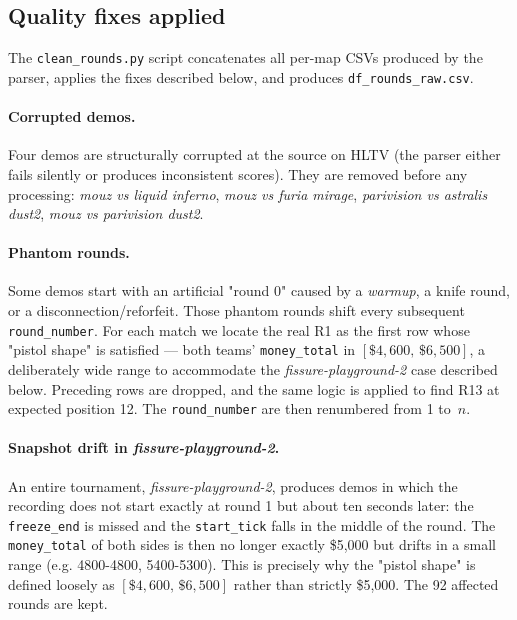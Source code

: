 \subsection{Quality fixes applied}
\label{annex:parsing_corrections}

The \texttt{clean\_rounds.py} script concatenates all per-map CSVs
produced by the parser, applies the fixes described below, and
produces \texttt{df\_rounds\_raw.csv}.

\paragraph{Corrupted demos.} Four demos are structurally corrupted at
the source on HLTV (the parser either fails silently or produces
inconsistent scores). They are removed before any processing:
\emph{mouz vs liquid inferno}, \emph{mouz vs furia mirage},
\emph{parivision vs astralis dust2}, \emph{mouz vs parivision dust2}.

\paragraph{Phantom rounds.} Some demos start with an artificial
"round 0" caused by a \emph{warmup}, a knife round, or a
disconnection/reforfeit. Those phantom rounds shift every subsequent
\texttt{round\_number}. For each match we locate the real R1 as the
first row whose "pistol shape" is satisfied --- both teams'
\texttt{money\_total} in $[\$4{,}600,\, \$6{,}500]$, a deliberately
wide range to accommodate the \textit{fissure-playground-2} case
described below. Preceding rows are dropped, and the same logic is
applied to find R13 at expected position 12. The
\texttt{round\_number} are then renumbered from 1 to~$n$.

\paragraph{Snapshot drift in \textit{fissure-playground-2}.} An
entire tournament, \textit{fissure-playground-2}, produces demos in
which the recording does not start exactly at round 1 but about ten
seconds later: the \texttt{freeze\_end} is missed and the
\texttt{start\_tick} falls in the middle of the round. The
\texttt{money\_total} of both sides is then no longer exactly
\$5{,}000 but drifts in a small range (e.g. 4800-4800, 5400-5300).
This is precisely why the "pistol shape" is defined loosely as
$[\$4{,}600,\, \$6{,}500]$ rather than strictly \$5{,}000. The 92
affected rounds are kept.

